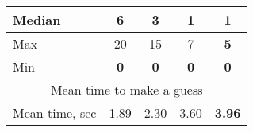 \begin{table}
\begin{tabular}{|l|c|c|c|c|}
\cellcolor[HTML]{ECF4FF}Median         & \cellcolor[HTML]{ECF4FF}6                                           & \cellcolor[HTML]{ECF4FF}3                                          & \cellcolor[HTML]{ECF4FF}\textbf{1}                        & \cellcolor[HTML]{ECF4FF}\textbf{1}                            \\ \hline
\cellcolor[HTML]{ECF4FF}Max            & \cellcolor[HTML]{ECF4FF}20                                          & \cellcolor[HTML]{ECF4FF}15                                         & \cellcolor[HTML]{ECF4FF}7                                 & \cellcolor[HTML]{ECF4FF}\textbf{5}                            \\ \hline
\cellcolor[HTML]{ECF4FF}Min            & \cellcolor[HTML]{ECF4FF}\textbf{0}                                  & \cellcolor[HTML]{ECF4FF}\textbf{0}                                 & \cellcolor[HTML]{ECF4FF}\textbf{0}                        & \cellcolor[HTML]{ECF4FF}\textbf{0}                            \\ \hline
\multicolumn{5}{|c|}{\cellcolor[HTML]{FBFBE6}Mean time to make a guess}                                                                                                                                                                                                                                       \\ \hline
\cellcolor[HTML]{FBFBE6}Mean time, sec & \cellcolor[HTML]{FBFBE6}1.89                                        & \cellcolor[HTML]{FBFBE6}2.30                                       & \cellcolor[HTML]{FBFBE6}3.60                              & \cellcolor[HTML]{FBFBE6}\textbf{3.96}                         \\ \hline
\end{tabular}
\end{table}
